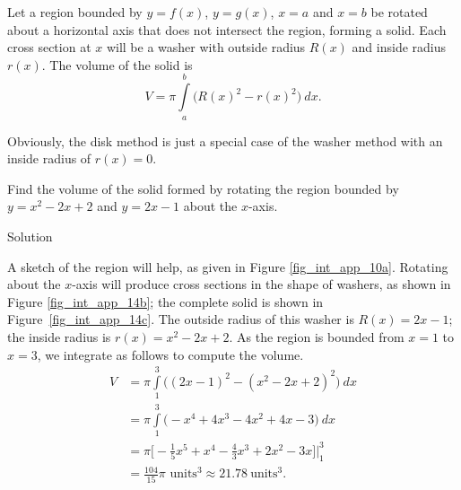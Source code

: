 Let a region bounded by $y=f(x)$, $y=g(x)$, $x=a$ and $x=b$ be rotated about a horizontal axis that does not intersect the region, forming a solid. Each cross section at $x$ will be a washer with outside radius $R(x)$ and inside radius $r(x)$. The volume of the solid is
\begin{equation}
V = \pi\int\limits_a^b \Big(R(x)^2-r(x)^2\Big)\ dx.
\label{idea:washermethod}
\end{equation}

Obviously, the disk method is just a special case of the washer method with an inside radius of $r(x)=0$.	


\begin{example}\label{ex_wash1}
Find the volume of the solid formed by rotating the region bounded by $y=x^2-2x+2$ and \linebreak $y=2x-1$ about the $x$-axis.

Solution 

A sketch of the region will help, as given in Figure \ref{fig_int_app_10a}. Rotating about the $x$-axis will produce cross sections in the shape of washers, as shown in Figure \ref{fig_int_app_14b}; the complete solid is shown in Figure~\ref{fig_int_app_14c}. The outside radius of this washer is $R(x) = 2x-1$; the inside radius is $r(x) = x^2-2x+2$. As the region is bounded from $x=1$ to $x=3$, we integrate as follows to compute the volume.
\begin{align*}
V &= \pi\int\limits_1^3 \Big((2x-1)^2-(x^2-2x+2)^2\Big)\ dx \\[0.2cm]
		&= \pi\int\limits_1^3 \big(-x^4+4x^3-4x^2+4x-3\big)\ dx \\[0.2cm]
		&= \pi\Big[-\frac{1}{5}x^5+x^4-\frac43x^3+2x^2-3x\Big]\Big|_1^3 \\[0.2cm]
		&=\frac{104}{15}\pi\text{ units}^3 \approx 21.78\ \text{units}^3.
\end{align*}	



\end{example}

